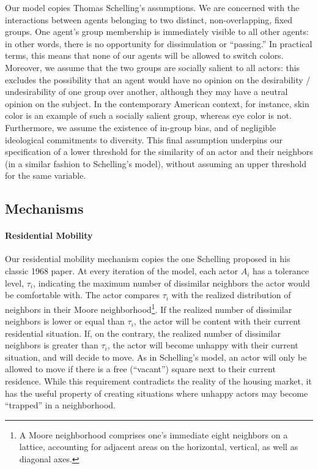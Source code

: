 \documentclass[a4paper,10pt]{article}
\begin{document}
Our model copies Thomas Schelling's assumptions. We are concerned with the interactions between agents belonging to two distinct, non-overlapping, fixed groups. One agent's group membership is immediately visible to all other agents: in other words, there is no opportunity for dissimulation or ``passing.'' In practical terms, this means that none of our agents will be allowed to switch colors. Moreover, we assume that the two groups are socially salient to all actors: this excludes the possibility that an agent would have no opinion on the desirability / undesirability of one group over another, although they may have a neutral opinion on the subject. In the contemporary American context, for instance, skin color is an example of such a socially salient group, whereas eye color is not. Furthermore, we assume the existence of in-group bias, and of negligible ideological commitments to diversity. This final assumption underpins our specification of a lower threshold for the similarity of an actor and their neighbors (in a similar fashion to Schelling's model), without assuming an upper threshold for the same variable. 

\subsection{Mechanisms}

\paragraph{Residential Mobility} Our residential mobility mechanism copies the one Schelling proposed in his classic 1968 paper. At every iteration of the model, each actor $A_i$ has a tolerance level, $\tau_i$, indicating the maximum number of dissimilar neighbors the actor would be comfortable with. The actor compares $\tau_i$ with the realized distribution of neighbors in their Moore neighborhood\footnote{A Moore neighborhood comprises one's immediate eight neighbors on a lattice, accounting for adjacent areas on the horizontal, vertical, as well as diagonal axes.}. If the realized number of dissimilar neighbors is lower or equal than $\tau_i$, the actor will be content with their current residential situation. If, on the contrary, the realized number of dissimilar neighbors is greater than $\tau_i$, the actor will become unhappy with their current situation, and will decide to move. As in Schelling's model, an actor will only be allowed to move if there is a free (``vacant'') square next to their current residence. While this requirement contradicts the reality of the housing market, it has the useful property of creating situations where unhappy actors may become ``trapped'' in a neighborhood. 
\end{document}
